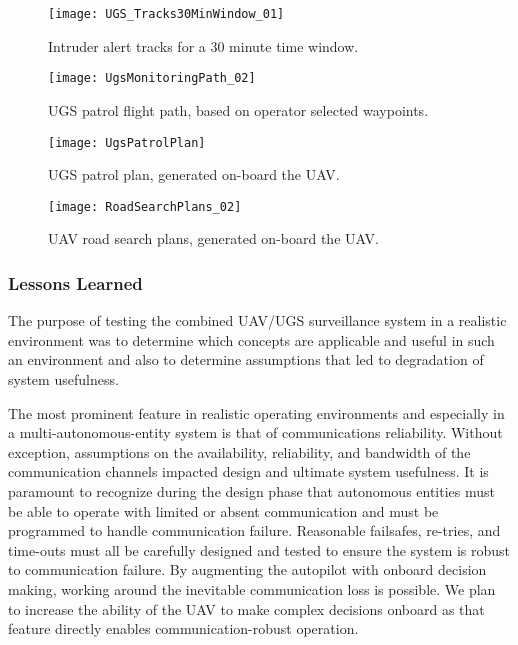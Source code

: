 \documentclass[letterpaper, 12 pt, conference]{ieeeconf}  %
\theoremstyle{definition}
\begin{document}
\begin{figure}[htb]
\centering
      \texttt{[image: UGS\_Tracks30MinWindow\_01]}
      \caption{Intruder alert tracks for a 30 minute time window.}
      \label{fig:UGS_Tracks30MinWindow_01}
\end{figure}

\begin{figure}[htb]
\centering
      \texttt{[image: UgsMonitoringPath\_02]}
      \caption{UGS patrol flight path, based on operator selected waypoints.}
      \label{fig:UgsMonitoringPath}
\end{figure}

\begin{figure}[htb]
\centering
      \texttt{[image: UgsPatrolPlan]}
      \caption{UGS patrol plan, generated on-board the UAV.}
      \label{fig:UgsPatrolPlan}
\end{figure}

\begin{figure}[htb]
\centering
      \texttt{[image: RoadSearchPlans\_02]}
      \caption{UAV road search plans, generated on-board the UAV.}
      \label{fig:RoadSearchPlans}
\end{figure}

\subsubsection{Lessons Learned}

The purpose of testing the combined UAV/UGS surveillance system in a realistic environment was to determine which concepts are applicable and useful in such an environment and also to determine assumptions that led to degradation of system usefulness.

The most prominent feature in realistic operating environments and especially in a multi-autonomous-entity system is that of communications reliability. Without exception, assumptions on the availability, reliability, and bandwidth of the communication channels impacted design and ultimate system usefulness. It is paramount to recognize during the design phase that autonomous entities must be able to operate with limited or absent communication and must be programmed to handle communication failure. Reasonable failsafes, re-tries, and time-outs must all be carefully designed and tested to ensure the system is robust to communication failure. By augmenting the autopilot with onboard decision making, working around the inevitable communication loss is possible. We plan to increase the ability of the UAV to make complex decisions onboard as that feature directly enables communication-robust operation.
\end{document}
